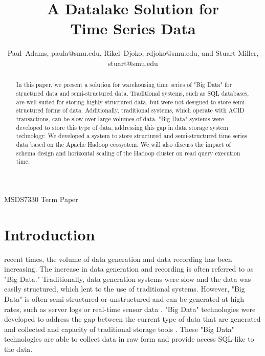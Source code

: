 \documentclass[journal]{IEEEtran}
\begin{document}
\title{A Datalake Solution for\\ 
       Time Series Data}

\author{Paul~Adams, paula@smu.edu,
        Rikel~Djoko, rdjoko@smu.edu,
        and Stuart Miller, stuart@smu.edu}

{MSDS7330 Term Paper}

\maketitle

\begin{abstract}

In this paper, we present a solution for warehousing time series of "Big Data"
 for structured data and semi-structured data.
Traditional systems, such as SQL databases, are well suited for storing highly structured data,
 but were not designed to store semi-structured forms of data.
Additionally, traditional systems, which operate with ACID transactions,
 can be slow over large volumes of data.
"Big Data" systems were developed to store this type of data,
 addressing this gap in data storage system technology.
We developed a system to store structured and semi-structured time series data based on the 
 Apache Hadoop ecosystem.
We will also discuss the impact of schema design and
 horizontal scaling of the Hadoop cluster on read query execution time.

\end{abstract}

\section{Introduction}


 recent times, the volume of data generation and
 data recording has been increasing.
The increase in data generation and recording is often referred to as "Big Data."
Traditionally, data generation systems were slow and the data was easily structured, 
 which lent to the use of traditional systems.
However, "Big Data" is often semi-structured or unstructured and
 can be generated at high rates,
  such as server logs or real-time sensor data \cite{Intel}.
"Big Data" technologies were developed to address the gap between the current type of data
 that are generated and collected and capacity of traditional storage tools \cite{BigDataComputing}.
These "Big Data" technologies are able to collect data in raw form and
 provide access SQL-like to the data.
\end{document}
